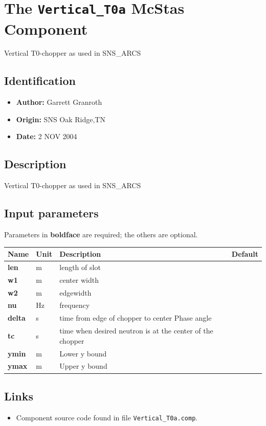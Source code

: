 \section{The \texttt{Vertical\_T0a} McStas Component}
Vertical T0-chopper as used in SNS\_ARCS

\subsection*{Identification}
\begin{itemize}
  \item \textbf{Author:} Garrett Granroth
  \item \textbf{Origin:} SNS Oak Ridge,TN
  \item \textbf{Date:} 2 NOV 2004
\end{itemize}

\subsection*{Description}
Vertical T0-chopper as used in SNS\_ARCS

\subsection*{Input parameters}
Parameters in \textbf{boldface} are required; the others are optional.

\begin{longtable}{p{}p{}p{}p{}}
\toprule
\textbf{Name} & \textbf{Unit} & \textbf{Description} & \textbf{Default} \\
\midrule
\endhead
\textbf{len} & m & length of slot &  \\
\textbf{w1} & m & center width &  \\
\textbf{w2} & m & edgewidth &  \\
\textbf{nu} & Hz & frequency &  \\
\textbf{delta} & s & time from edge of chopper to center Phase angle &  \\
\textbf{tc} & s & time when desired neutron is at the center of the chopper &  \\
\textbf{ymin} & m & Lower y bound &  \\
\textbf{ymax} & m & Upper y bound &  \\
\bottomrule
\end{longtable}

\subsection*{Links}
\begin{itemize}
  \item Component source code found in file \texttt{Vertical\_T0a.comp}.
\end{itemize}
